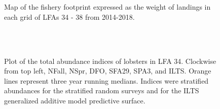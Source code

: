 \documentclass[11pt]{article}
\newcommand{\e}{/SpinDr/backup/bio_data/bio.lobster/figures/LFA3438Framework2019/} %
\begin{document}
\begin{figure}
        \centering
    \\
                \\
        
         \caption{Map of the fishery footprint expressed as the weight of landings in each grid of LFAs 34 - 38 from 2014-2018.}
        \end{figure}

\begin{landscape}
\begin{figure}
        \centering
    \\
                \\
        
         \caption{Plot of the total abundance indices of lobsters in LFA 34. Clockwise from top left, NFall, NSpr, DFO, SFA29, SPA3, and ILTS.
         Orange lines represent three year running medians. Indices were stratified abundances for the stratified random surveys and for the ILTS generalized additive model predictive surface.}
        \end{figure}
\end{landscape}
\end{document}

